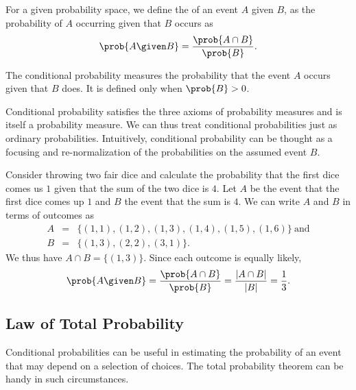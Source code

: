 \begin{definition}
For a given probability space, we define the  of an event $A$ given $B$, as the probability of $A$
occurring given that $B$ occurs as
\[
\prob{A \given B} = \frac{\prob{A \cap B}}{\prob{B}}. 
\]

The conditional probability measures the probability that the event
$A$ occurs given that $B$ does.  It is defined only when $\prob{B} > 0$.
\end{definition}


\begin{flex}

\begin{gram}
Conditional probability satisfies the three axioms of probability measures and is itself a probability measure.
We can thus treat conditional probabilities just as ordinary
probabilities.  Intuitively, conditional probability can be thought as
a focusing and re-normalization of the probabilities on the
assumed event $B$.
%
\end{gram}

\begin{example}
Consider throwing two fair dice and calculate the probability that the
first dice comes us $1$ given that the sum of the two dice is $4$. 
%
Let $A$ be the event  that the first dice comes up $1$ and $B$ the
event that the sum is $4$.
%
We can write $A$ and $B$ in terms of outcomes as 
\[
\begin{array}{lll}
A & = & \{ (1,1), (1,2), (1,3), (1,4), (1,5), (1,6) \}~\mbox{and}
\\
B & = & \{ (1,3), (2,2), (3,1) \}.
\end{array}
\]
We thus have $A \cap B = \{ (1,3) \}$.
%
Since each outcome is equally likely, 
\[
\prob{A \given B} = \frac{\prob{A \cap B}}{\prob{B}} 
%
= 
%
\frac{|A \cap B|}{|B|} = \frac{1}{3}.
\]
\end{example}
\end{flex}

\subsection{Law of Total Probability}
\label{sec:probability::spaces::LTP}
\begin{gram}
  
Conditional probabilities can be useful in estimating the probability
of an event that may depend on a selection of choices.
%
The total probability theorem can be handy in such circumstances.
\end{gram}

